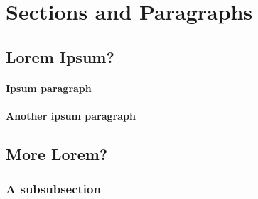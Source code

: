 \section{Sections and Paragraphs} %
\label{sec:sections_and_paragraphs}

\subsection{Lorem Ipsum?} %
\label{sub:lorem_ipsum_}

\paragraph{Ipsum paragraph} %
\label{par:ipsum_paragraph}
\lipsum[1-1]

\paragraph{Another ipsum paragraph} %
\label{par:another_ipsum_paragraph}
\lipsum[1-1]


\subsection{More Lorem?} %
\label{sub:more_lorem_}

\subsubsection{A subsubsection}
\lipsum[1-1]


